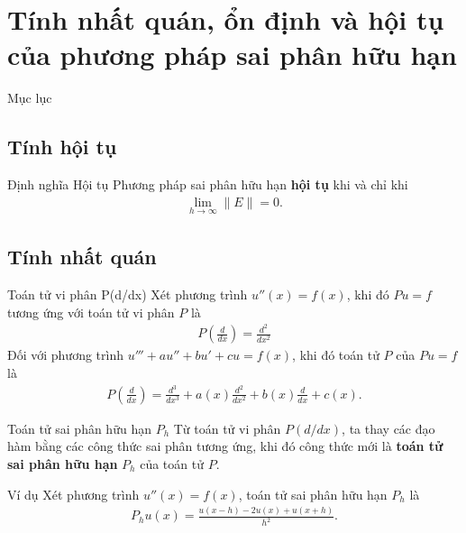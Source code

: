 \documentclass[9pt]{beamer}
\numberwithin{equation}{section}
\begin{document}
\section{Tính nhất quán, ổn định và hội tụ của phương pháp sai phân hữu hạn}

\begin{frame}{Mục lục}
    \tableofcontents[currentsection, sections={3-4}]
\end{frame}

\subsection{Tính hội tụ}

\begin{frame}
\begin{block}{Định nghĩa Hội tụ}
    Phương pháp sai phân hữu hạn \textbf{hội tụ} khi và chỉ khi
    \begin{align*}
        \lim_{h \to \infty} \|E\| = 0.
    \end{align*}
\end{block}
\end{frame}

\subsection{Tính nhất quán}

\begin{frame}
\begin{block}{Toán tử vi phân P(d/dx)}
    Xét phương trình $u''(x) = f(x)$, khi đó $Pu = f$ tương ứng với toán tử vi phân $P$ là
    \begin{align*}
        P\left(\frac{d}{dx}\right) = \frac{d^2}{dx^2}
    \end{align*}
    Đối với phương trình $u''' + au'' + bu' + cu = f(x)$, khi đó toán tử $P$ của $Pu = f$ là
    \begin{align*}
        P\left(\frac{d}{dx}\right) = \frac{d^3}{dx^3} + a(x)\frac{d^2}{dx^2} + b(x)\frac{d}{dx} + c(x).
    \end{align*}
\end{block}
\end{frame}

\begin{frame}
\begin{block}{Toán tử sai phân hữu hạn $P_h$}
    Từ toán tử vi phân $P(d/dx)$, ta thay các đạo hàm bằng các công thức sai phân tương ứng, khi đó công thức mới là \textbf{toán tử sai phân hữu hạn} $P_h$ của toán tử $P$.
\end{block}

\begin{exampleblock}{Ví dụ}
    Xét phương trình $u''(x) = f(x)$, toán tử sai phân hữu hạn $P_h$ là
    \begin{align*}
        P_h u(x) = \frac{u(x-h) - 2u(x) + u(x+h)}{h^2}.
    \end{align*}
\end{exampleblock}
\end{frame}
\end{document}
